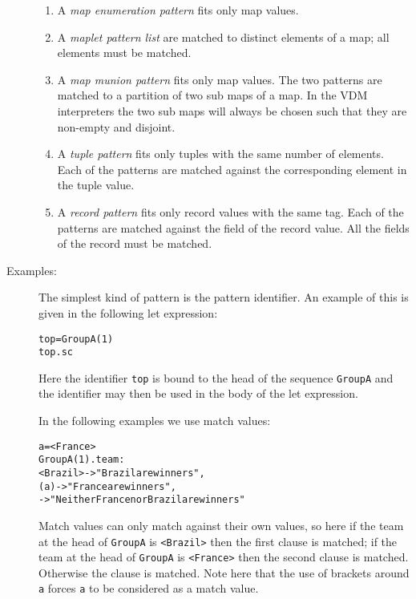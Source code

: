 \documentclass[\pformat,12pt]{article}
\begin{document}
\begin{description}
\begin{enumerate}
  \item A {\it map enumeration pattern} fits only map values. 

  \item A {\it maplet pattern list} are matched to distinct elements of a map; 
   all elements must be matched.

  \item A {\it map munion pattern} fits only map values. 
   The two patterns are matched to a partition of two sub maps of a map.
   In the VDM interpreters the two sub maps will always be chosen such that they are non-empty and disjoint.

  \item A {\it tuple pattern} fits only tuples with the same number of
    elements. Each of the patterns are matched against the corresponding
    element in the tuple value.

  \item A {\it record pattern} fits only record values with the same tag.
    Each of the patterns are matched against the field of the record value.
    All the fields of the record must be matched.
  \end{enumerate}

\item[Examples:] The simplest kind of pattern is the pattern
identifier. An example of this is given in the following let
expression:
\begin{alltt}
   top = GroupA(1)
   top.sc
\end{alltt}
Here the identifier \texttt{top} is bound to the head of the sequence
\texttt{GroupA} and the identifier may then be used in the body of the
let expression.

In the following examples we use match values:
\begin{alltt}
   a = <France>
    GroupA(1).team:
             <Brazil> -> "Brazil are winners",
             (a)      -> "France are winners",
                 -> "Neither France nor Brazil are winners"
\end{alltt}
Match values can only match against their own values, so here if the
team at the head of \texttt{GroupA} is \texttt{<Brazil>} then the
first clause is matched; if the team at the head of \texttt{GroupA} is
\texttt{<France>} then the second clause is matched. Otherwise the
 clause is matched. Note here that the use of brackets
around \texttt{a} forces \texttt{a} to be considered as a match value.


\end{description}
\end{document}
